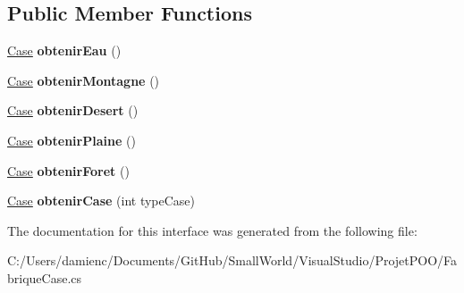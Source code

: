 \subsection*{Public Member Functions}
\begin{DoxyCompactItemize}
\item 
\hypertarget{interface_small_world_1_1_inter_fabrique_case_a1434bcec9bf29cfd87d80bb0b71c709c}{\hyperlink{class_small_world_1_1_case}{Case} {\bfseries obtenir\-Eau} ()}\label{interface_small_world_1_1_inter_fabrique_case_a1434bcec9bf29cfd87d80bb0b71c709c}

\item 
\hypertarget{interface_small_world_1_1_inter_fabrique_case_af726293fdccaa7f5af1729551a6dd1ed}{\hyperlink{class_small_world_1_1_case}{Case} {\bfseries obtenir\-Montagne} ()}\label{interface_small_world_1_1_inter_fabrique_case_af726293fdccaa7f5af1729551a6dd1ed}

\item 
\hypertarget{interface_small_world_1_1_inter_fabrique_case_a9ffa841ddec5636b3241db2e4cf51b49}{\hyperlink{class_small_world_1_1_case}{Case} {\bfseries obtenir\-Desert} ()}\label{interface_small_world_1_1_inter_fabrique_case_a9ffa841ddec5636b3241db2e4cf51b49}

\item 
\hypertarget{interface_small_world_1_1_inter_fabrique_case_a8f35df965c3546307d905b2909dca774}{\hyperlink{class_small_world_1_1_case}{Case} {\bfseries obtenir\-Plaine} ()}\label{interface_small_world_1_1_inter_fabrique_case_a8f35df965c3546307d905b2909dca774}

\item 
\hypertarget{interface_small_world_1_1_inter_fabrique_case_aaf69be0da8fc845f9e8418e028cf41fc}{\hyperlink{class_small_world_1_1_case}{Case} {\bfseries obtenir\-Foret} ()}\label{interface_small_world_1_1_inter_fabrique_case_aaf69be0da8fc845f9e8418e028cf41fc}

\item 
\hypertarget{interface_small_world_1_1_inter_fabrique_case_a67a341c2ee1caef98513b5fe701e953b}{\hyperlink{class_small_world_1_1_case}{Case} {\bfseries obtenir\-Case} (int type\-Case)}\label{interface_small_world_1_1_inter_fabrique_case_a67a341c2ee1caef98513b5fe701e953b}

\end{DoxyCompactItemize}


The documentation for this interface was generated from the following file\-:\begin{DoxyCompactItemize}
\item 
C\-:/\-Users/damienc/\-Documents/\-Git\-Hub/\-Small\-World/\-Visual\-Studio/\-Projet\-P\-O\-O/Fabrique\-Case.\-cs\end{DoxyCompactItemize}
